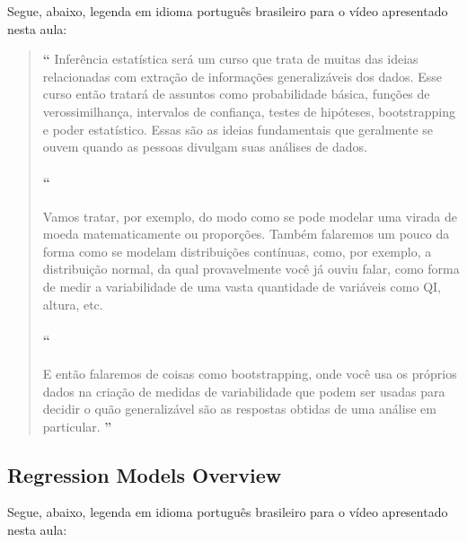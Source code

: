 Segue, abaixo, legenda em idioma português brasileiro para o vídeo apresentado nesta aula:

\begin{quotation}%
\begin{small}
{\large\textbf{``}}%
Inferência estatística será um curso que trata  de muitas das ideias relacionadas com extração de informações generalizáveis dos dados. Esse curso então tratará de assuntos como probabilidade básica, funções de verossimilhança, intervalos de confiança, testes de hipóteses, bootstrapping e poder estatístico. Essas são as ideias fundamentais  que geralmente se ouvem quando as pessoas divulgam suas análises de dados. 

\paragraph{``}
Vamos tratar, por exemplo, do modo como se pode modelar uma virada de moeda matematicamente ou proporções. Também falaremos um pouco da forma como se modelam distribuições contínuas, como, por exemplo, a distribuição normal, da qual provavelmente você já ouviu falar, como forma de medir a variabilidade  de uma vasta quantidade de variáveis como QI, altura, etc. 

\paragraph{``}
E então falaremos de coisas como bootstrapping, onde você usa os próprios dados na criação de medidas de variabilidade que podem ser usadas para decidir o quão generalizável são as respostas obtidas de uma análise em particular. 
{\large\textbf{''}}
\end{small}
\end{quotation}


\subsection{Regression Models Overview}

Segue, abaixo, legenda em idioma português brasileiro para o vídeo apresentado nesta aula:

